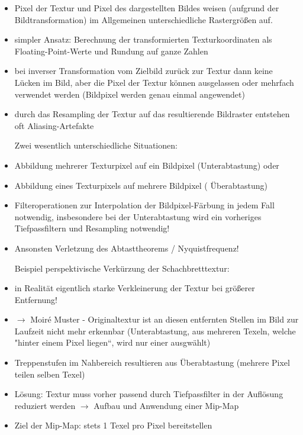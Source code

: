 \documentclass[10pt,landscape]{article}
\makeatletter
\renewcommand{\subsection}{\@startsection{subsection}{2}{0mm}%
                                {-1explus -.5ex minus -.2ex}%
                                {0.5ex plus .2ex}%
                                {\normalfont\normalsize\bfseries}}
\makeatother
\begin{document}
\begin{multicols}{3}
{\begin{itemize}
  
  Was? aus Originaltextur Bildung einer Menge jeweils kleinerer Texturen (halbe Kantenlänge)
  
  Wozu? Vermeidung/Abmilderung von Aliasing-Effekten durch "Vorfilterung" und Anwendung der passend aufgelösten Textur(-en) (1 Pixel $\approx$ 1 Texel) per bilinearer Filterung oder trilinearer Filterung
  
  Aliasing-Effekte durch Koordinatentransformation:
  \item Pixel der Textur und Pixel des dargestellten Bildes weisen (aufgrund der Bildtransformation) im Allgemeinen unterschiedliche Rastergrößen auf.
  \item simpler Ansatz: Berechnung der transformierten Texturkoordinaten als Floating-Point-Werte und Rundung auf ganze Zahlen
  \item bei inverser Transformation vom Zielbild zurück zur Textur dann keine Lücken im Bild, aber die Pixel der Textur können ausgelassen oder mehrfach verwendet werden (Bildpixel werden genau einmal angewendet)
  \item durch das Resampling der Textur auf das resultierende Bildraster entstehen oft Aliasing-Artefakte
  
  Zwei wesentlich unterschiedliche Situationen:
  \item Abbildung mehrerer Texturpixel auf ein Bildpixel (Unterabtastung) oder
  \item Abbildung eines Texturpixels auf mehrere Bildpixel ( Überabtastung)
  \item Filteroperationen zur Interpolation der Bildpixel-Färbung in jedem Fall notwendig, insbesondere bei der Unterabtastung wird ein vorheriges Tiefpassfiltern und Resampling notwendig!
  \item Ansonsten Verletzung des Abtasttheorems / Nyquistfrequenz!
  
  Beispiel perspektivische Verkürzung der Schachbretttextur:
  \item in Realität eigentlich starke Verkleinerung der Textur bei größerer Entfernung!
  \item $\rightarrow$ Moiré Muster - Originaltextur ist an diesen entfernten Stellen im Bild zur Laufzeit nicht mehr erkennbar (Unterabtastung, aus mehreren Texeln, welche "hinter einem Pixel liegen“, wird nur einer ausgwählt)
  \item Treppenstufen im Nahbereich resultieren aus Überabtastung (mehrere Pixel teilen selben Texel)
  \item Lösung: Textur muss vorher passend durch Tiefpassfilter in der Auflösung reduziert werden $\rightarrow$ Aufbau und Anwendung einer Mip-Map
  \item Ziel der Mip-Map: stets 1 Texel pro Pixel bereitstellen
  

\end{itemize}}
\end{multicols}
\end{document}
